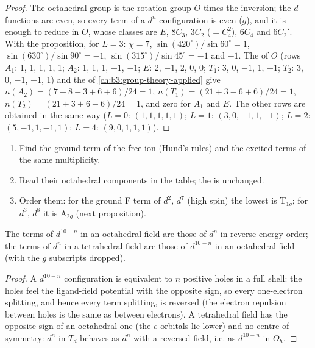 \begin{proof}
The octahedral group is the rotation group $O$ times the inversion; the $d$ functions
are even, so every term of a $d^n$ configuration is even ($g$), and it is enough to
reduce in $O$, whose classes are $E$, $8C_3$, $3C_2$ ($=C_4^2$), $6C_4$ and $6C_2'$. With the
proposition, for $L = 3$: $\chi = 7$, $\sin(420^\circ)/\sin60^\circ = 1$, $\sin(630^\circ)/\sin90^\circ = -1$, $\sin(315^\circ)/\sin45^\circ = -1$
and $-1$. The  of $O$ (rows $A_1$: 1, 1, 1, 1, 1; $A_2$: 1, 1, 1, $-1$, $-1$; $E$: 2,
$-1$, 2, 0, 0; $T_1$: 3, 0, $-1$, 1, $-1$; $T_2$: 3, 0, $-1$, $-1$, 1) and the  of
\cref{ch:b3:group-theory-applied} give $n(A_2) = (7 + 8 - 3 + 6 + 6)/24 = 1$, $n(T_1) = (21 + 3 - 6 +
6)/24 = 1$, $n(T_2) = (21 + 3 + 6 - 6)/24 = 1$, and zero for $A_1$ and $E$. The other rows are
obtained in the same way ($L = 0$: $(1, 1, 1, 1, 1)$; $L = 1$: $(3, 0, -1, 1, -1)$; $L = 2$: $(5, -1, 1,
-1, 1)$; $L = 4$: $(9, 0, 1, 1, 1)$).
\end{proof}

\begin{method}\label{met:b3:complex-spectra-magnetism:split-term}
\begin{enumerate}
  \item Find the ground term of the free ion (Hund's rules) and the excited
        terms of the same multiplicity.
  \item Read their octahedral components in the table; the  is
        unchanged.
  \item Order them: for the ground F term of $d^2$, $d^7$ (high spin) the lowest is T$_{1g}$;
        for $d^3$, $d^8$ it is A$_{2g}$ (next proposition).
\end{enumerate}
\end{method}

\begin{proposition}\label{prop:b3:complex-spectra-magnetism:hole}
The terms of $d^{10-n}$ in an octahedral field are those of $d^n$ in reverse energy
order; the terms of $d^n$ in a tetrahedral field are those of $d^{10-n}$ in an octahedral
field (with the $g$ subscripts dropped).
\end{proposition}

\begin{proof}
A $d^{10-n}$ configuration is equivalent to $n$ positive holes in a full shell: the
holes feel the ligand-field potential with the opposite sign, so every
one-electron splitting, and hence every term splitting, is reversed (the
electron repulsion between holes is the same as between electrons). A
tetrahedral field has the opposite sign of an octahedral one (the $e$ orbitals
lie lower) and no centre of symmetry: $d^n$ in $T_d$ behaves as $d^n$ with a reversed
field, i.e. as $d^{10-n}$ in $O_h$.
\end{proof}

